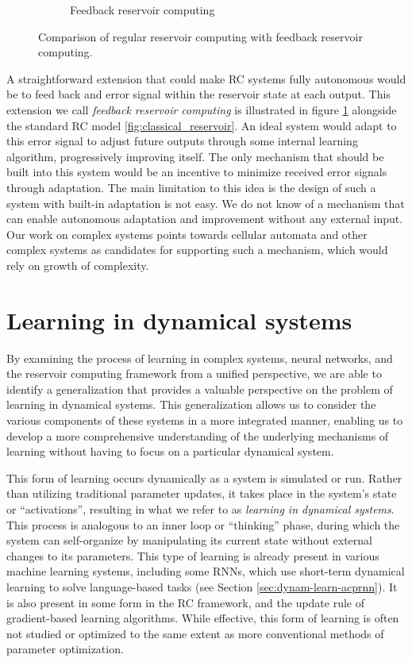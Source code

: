 \begin{figure}[htbp]
\begin{subfigure}[t]{.45\linewidth}
    \caption{Feedback reservoir computing}
    \label{fig:feedback_reservoir}
  \end{subfigure}
  \caption{Comparison of regular reservoir computing with feedback reservoir
    computing.}
  \label{"waiting for reftex-label call..."}
\end{figure}

A straightforward extension that could make \ac{RC} systems fully autonomous
would be to feed back and error signal within the reservoir state at each
output. This extension we call \emph{feedback reservoir computing} is
illustrated in figure \ref{fig:feedback_reservoir} alongside the standard
\ac{RC} model \ref{fig:classical_reservoir}. An ideal system would adapt to this
error signal to adjust future outputs through some internal learning algorithm,
progressively improving itself. The only mechanism that should be built into
this system would be an incentive to minimize received error signals through
adaptation. The main limitation to this idea is the design of such a system with
built-in adaptation is not easy. We do not know of a mechanism that can enable
autonomous adaptation and improvement without any external input. Our work on
complex systems points towards cellular automata and other complex systems as
candidates for supporting such a mechanism, which would rely on growth of
complexity.

\section{Learning in dynamical systems}

By examining the process of learning in complex systems, neural networks, and
the reservoir computing framework from a unified perspective, we are able to
identify a generalization that provides a valuable perspective on the problem of
learning in dynamical systems. This generalization allows us to consider the
various components of these systems in a more integrated manner, enabling us to
develop a more comprehensive understanding of the underlying mechanisms of
learning without having to focus on a particular dynamical system.

This form of learning occurs dynamically as a system is simulated or run. Rather
than utilizing traditional parameter updates, it takes place in the system's
state or ``activations'', resulting in what we refer to as \emph{learning in
  dynamical systems}. This process is analogous to an inner loop or ``thinking''
phase, during which the system can self-organize by manipulating its current
state without external changes to its parameters. This type of learning is
already present in various machine learning systems, including some \acfp{RNN},
which use short-term dynamical learning to solve language-based tasks (see
Section \ref{sec:dynam-learn-acprnn}). It is also present in some form in the
\ac{RC} framework, and the update rule of gradient-based learning algorithms.
While effective, this form of learning is often not studied or optimized to the
same extent as more conventional methods of parameter optimization.

